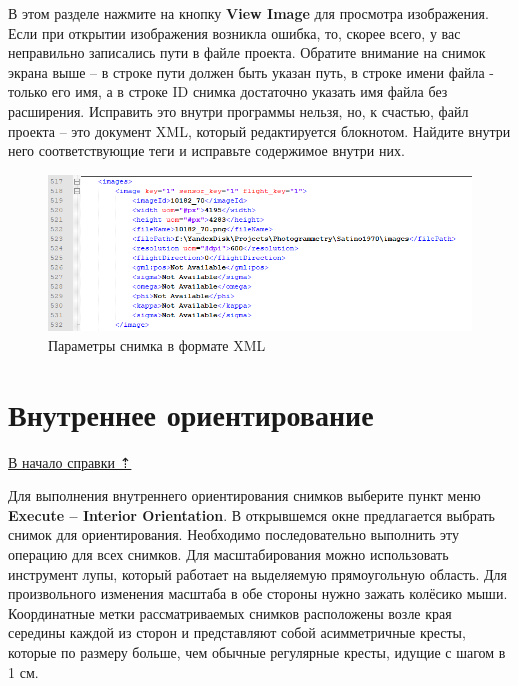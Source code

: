 \documentclass[
  12pt,
]{book}
\begin{document}
В этом разделе нажмите на кнопку \textbf{View Image} для просмотра изображения. Если при открытии изображения возникла ошибка, то, скорее всего, у вас неправильно записались пути в файле проекта. Обратите внимание на снимок экрана выше -- в строке пути должен быть указан путь, в строке имени файла - только его имя, а в строке ID снимка достаточно указать имя файла без расширения. Исправить это внутри программы нельзя, но, к счастью, файл проекта -- это документ XML, который редактируется блокнотом. Найдите внутри него соответствующие теги и исправьте содержимое внутри них.

\begin{figure}
\centering
\includegraphics{images/Ref13/XML_editing.png}
\caption{Параметры снимка в формате XML}
\end{figure}

\hypertarget{stereo-interior}{%
\section{Внутреннее ориентирование}\label{stereo-interior}}

\protect\hyperlink{stereo}{В начало справки ⇡}

Для выполнения внутреннего ориентирования снимков выберите пункт меню \textbf{Execute -- Interior Orientation}. В открывшемся окне предлагается выбрать снимок для ориентирования. Необходимо последовательно выполнить эту операцию для всех снимков. Для масштабирования можно использовать инструмент лупы, который работает на выделяемую прямоугольную область. Для произвольного изменения масштаба в обе стороны нужно зажать колёсико мыши. Координатные метки рассматриваемых снимков расположены возле края середины каждой из сторон и представляют собой асимметричные кресты, которые по размеру больше, чем обычные регулярные кресты, идущие с шагом в 1 см.
\end{document}
